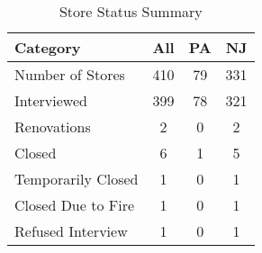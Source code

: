 \documentclass{article}
\begin{document}
\begin{table}[htbp]
\centering
\caption{Store Status Summary}
\label{tab:summary}
\begin{tabular}{lccc}
\toprule
Category & All & PA & NJ \\
\midrule
Number of Stores & 410 & 79 & 331 \\
Interviewed & 399 & 78 & 321 \\
Renovations & 2 & 0 & 2 \\
Closed & 6 & 1 & 5 \\
Temporarily Closed & 1 & 0 & 1 \\
Closed Due to Fire & 1 & 0 & 1 \\
Refused Interview & 1 & 0 & 1 \\
\bottomrule
\end{tabular}
\end{table}
\end{document}
